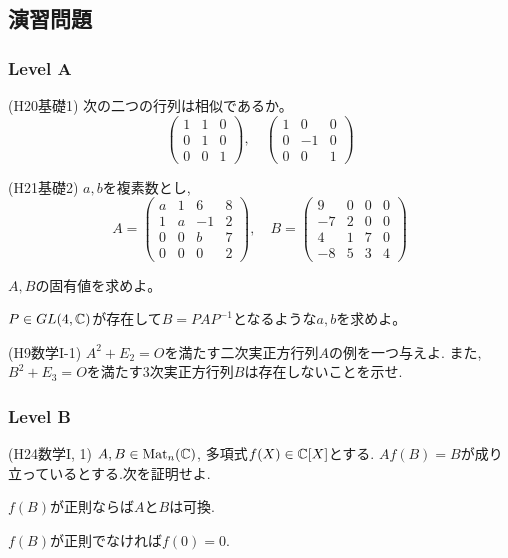 \clearpage
\subsection{演習問題}
\subsubsection{Level A}


\begin{prob} (H20基礎1) \label{prob:H20B1}
次の二つの行列は相似であるか。
\[
\begin{pmatrix}
1 & 1 & 0\\
0 & 1 & 0\\
0 & 0 & 1
\end{pmatrix},\quad
\begin{pmatrix}
1 & 0 & 0\\
0 & -1 & 0\\
0 & 0 & 1
\end{pmatrix}
\]
\end{prob}

\begin{prob} (H21基礎2) \label{prob:H21B2}
$a,b$を複素数とし,
\[
A=\begin{pmatrix}
a & 1 & 6 & 8\\
1 & a & -1 & 2\\
0 & 0 & b & 7 \\
0 & 0 & 0 & 2
\end{pmatrix}
,\quad
B=\begin{pmatrix}
9 & 0 & 0 & 0\\
-7 & 2 & 0 & 0\\
4 & 1 & 7 & 0 \\
-8 & 5 & 3 & 4
\end{pmatrix}
\]
\ben
\item $A,B$の固有値を求めよ。
\item $P\in GL(4,\mathbb{C})$が存在して$B=PAP^{-1}$となるような$a,b$を求めよ。
\een
\end{prob}

\begin{prob} (H9数学I-1)
$A^2 + E_2 = O$を満たす二次実正方行列$A$の例を一つ与えよ. また, $B^2 + E_3 = O$を満たす3次実正方行列$B$は存在しないことを示せ.
\end{prob}

\subsubsection{Level B}
\begin{prob} (H24数学I, 1) \label{prob:H24-I-1}
$A,B\in \mathrm{Mat}_{n}(\mathbb{C})$, 多項式$f(X)\in \mathbb{C}[X]$とする. $Af(B) = B$が成り立っているとする.次を証明せよ.
\ben
\item $f(B)$が正則ならば$A$と$B$は可換.
\item $f(B)$が正則でなければ$f(0) = 0$.
\een
\end{prob}




